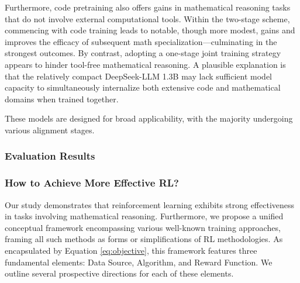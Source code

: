 Furthermore, code pretraining also offers gains in mathematical reasoning tasks that do not involve external computational tools. Within the two-stage scheme, commencing with code training leads to notable, though more modest, gains and improves the efficacy of subsequent math specialization—culminating in the strongest outcomes. By contrast, adopting a one-stage joint training strategy appears to hinder tool-free mathematical reasoning. A plausible explanation is that the relatively compact DeepSeek-LLM 1.3B may lack sufficient model capacity to simultaneously internalize both extensive code and mathematical domains when trained together.

These models are designed for broad applicability, with the majority undergoing various alignment stages.

\subsubsection{Evaluation Results}

\subsubsection{How to Achieve More Effective RL?}
\label{sec:effec_rl}
Our study demonstrates that reinforcement learning exhibits strong effectiveness in tasks involving mathematical reasoning. Furthermore, we propose a unified conceptual framework encompassing various well-known training approaches, framing all such methods as forms or simplifications of RL methodologies. As encapsulated by Equation \ref{eq:objective}, this framework features three fundamental elements: Data Source, Algorithm, and Reward Function. We outline several prospective directions for each of these elements.


